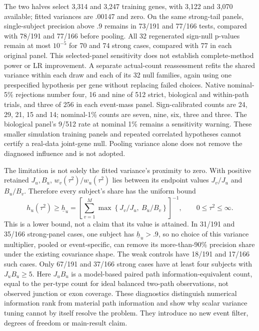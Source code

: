 \documentclass[11pt]{article}
\begin{document}
The two halves select 3,314 and 3,247 training genes, with 3,122 and 3,070 available; fitted variances are .00147 and zero. On the same strong-tail panels, single-subject precision above .9 remains in 73/191 and 77/166 tests, compared with 78/191 and 77/166 before pooling. All 32 regenerated sign-null p-values remain at most \(10^{-5}\) for 70 and 74 strong cases, compared with 77 in each original panel. This selected-panel sensitivity does not establish complete-method power or LR improvement. A separate actual-count reassessment refits the shared variance within each draw and each of its 32 null families, again using one prespecified hypothesis per gene without replacing failed choices. Native nominal-5\% rejections number four, 16 and nine of 512 strict, biological and within-path trials, and three of 256 in each event-mass panel. Sign-calibrated counts are 24, 29, 21, 15 and 14; nominal-1\% counts are seven, nine, six, three and three. The biological panel's 9/512 rate at nominal 1\% remains a sensitivity warning. These smaller simulation training panels and repeated correlated hypotheses cannot certify a real-data joint-gene null. Pooling variance alone does not remove the diagnosed influence and is not adopted.

The limitation is not solely the fitted variance's proximity to zero. With positive retained \(J_u,B_u\), \(w_v(\tau^2)/w_u(\tau^2)\) lies between its endpoint values \(J_v/J_u\) and \(B_u/B_v\). Therefore every subject's share has the uniform bound \begin{equation}h_u(\tau^2)\ge\underline h_u=\left[\sum_{v=1}^{M}\max\left\{J_v/J_u,\ B_u/B_v\right\}\right]^{-1},\qquad 0\le\tau^2\le\infty.\end{equation} This is a lower bound, not a claim that its value is attained. In 31/191 and 35/166 strong-panel cases, one subject has \(\underline h_u>.9\), so no choice of this variance multiplier, pooled or event-specific, can remove its more-than-90\% precision share under the existing covariance shape. The weak controls have 18/191 and 17/166 such cases. Only 67/191 and 37/166 strong cases have at least four subjects with \(J_uB_u\ge5\). Here \(J_uB_u\) is a model-based paired path information-equivalent count, equal to the per-type count for ideal balanced two-path observations, not observed junction or exon coverage. These diagnostics distinguish numerical information rank from material path information and show why scalar variance tuning cannot by itself resolve the problem. They introduce no new event filter, degrees of freedom or main-result claim.
\end{document}
